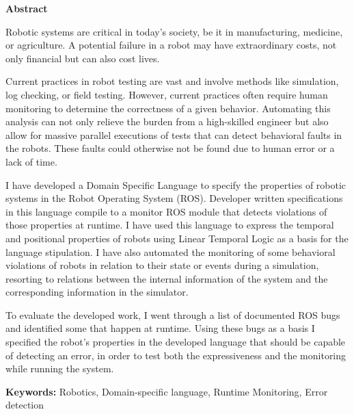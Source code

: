 \vspace*{2cm}
\begin{center}
\Large \bf Abstract
\end{center}
\vspace*{1cm} \setlength{\baselineskip}{0.6cm}

Robotic systems are critical in today's society, be it in manufacturing, medicine, or agriculture. A potential failure in a robot may have extraordinary costs, not only financial but can also cost lives.

Current practices in robot testing are vast and involve methods like simulation, log checking, or field testing. However, current practices often require human monitoring to determine the correctness of a given behavior. Automating this analysis can not only relieve the burden from a high-skilled engineer but also allow for massive parallel executions of tests that can detect behavioral faults in the robots. These faults could otherwise not be found due to human error or a lack of time.
    
I have developed a Domain Specific Language to specify the properties of robotic systems in the Robot Operating System (ROS). Developer written specifications in this language compile to a monitor ROS module that detects violations of those properties at runtime. I have used this language to express the temporal and positional properties of robots using Linear Temporal Logic as a basis for the language stipulation. I have also automated the monitoring of some behavioral violations of robots in relation to their state or events during a simulation, resorting to relations between the internal information of the system and the corresponding information in the simulator.

To evaluate the developed work, I went through a list of documented ROS bugs and identified some that happen at runtime. Using these bugs as a basis I specified the robot's properties in the developed language that should be capable of detecting an error, in order to test both the expressiveness and the monitoring while running the system.

\vfill

\begin{flushleft}
\textbf{Keywords:}
Robotics, Domain-specific language, Runtime Monitoring, Error detection
\end{flushleft}
